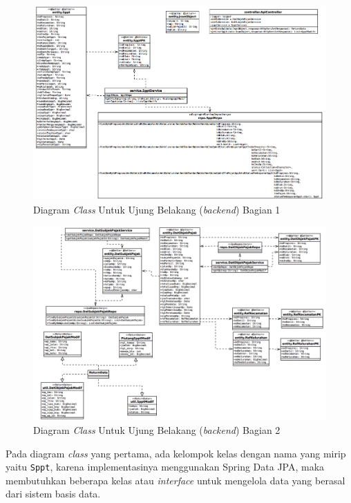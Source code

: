 \begin{figure}[H]
	\centering
	\includegraphics[width=1\textwidth]{./resources/uml/class-dia-be1}
	\caption{Diagram \textit{Class} Untuk Ujung Belakang (\textit{backend}) Bagian 1}
	\label{fig:class-dia-be-1}
\end{figure}

\begin{figure}[H]
	\centering
	\includegraphics[width=1\textwidth]{./resources/uml/class-dia-be2}
	\caption{Diagram \textit{Class} Untuk Ujung Belakang (\textit{backend}) Bagian 2}
	\label{fig:class-dia-be-2}
\end{figure}

Pada diagram \textit{class} yang pertama, ada kelompok kelas dengan nama yang mirip yaitu \texttt{Sppt}, karena implementasinya menggunakan Spring Data JPA, maka membutuhkan beberapa kelas atau \textit{interface} untuk mengelola data yang berasal dari sistem basis data.

